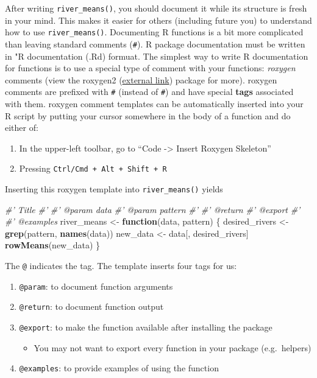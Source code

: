 \documentclass[
]{book}
\newenvironment{Shaded}{\begin{snugshade}}{\end{snugshade}}
\newcommand{\CommentTok}[1]{\textcolor[rgb]{0.56,0.35,0.01}{\textit{#1}}}
\newcommand{\ControlFlowTok}[1]{\textcolor[rgb]{0.13,0.29,0.53}{\textbf{#1}}}
\newcommand{\KeywordTok}[1]{\textcolor[rgb]{0.13,0.29,0.53}{\textbf{#1}}}
\newcommand{\NormalTok}[1]{#1}
\newcommand{\StringTok}[1]{\textcolor[rgb]{0.31,0.60,0.02}{#1}}
\providecommand{\tightlist}{%
  \setlength{\itemsep}{0pt}\setlength{\parskip}{0pt}}
\begin{document}
After writing \texttt{river\_means()}, you should document it while its structure is fresh in your mind. This makes it easier for others (including future you) to understand how to use \texttt{river\_means()}. Documenting R functions is a bit more complicated than leaving standard comments (\texttt{\#}). R package documentation must be written in "R documentation (.Rd) formuat. The simplest way to write R documentation for functions is to use a special type of comment with your functions: \emph{roxygen} comments (view the roxygen2 (\href{https://roxygen2.r-lib.org/}{external link}) package for more). roxygen comments are prefixed with \texttt{\#\textquotesingle{}} (instead of \texttt{\#}) and have special \textbf{tags} associated with them. roxygen comment templates can be automatically inserted into your R script by putting your cursor somewhere in the body of a function and do either of:

\begin{enumerate}
\def\labelenumi{\arabic{enumi}.}
\tightlist
\item
  In the upper-left toolbar, go to ``Code -\textgreater{} Insert Roxygen Skeleton''
\item
  Pressing \texttt{Ctrl/Cmd\ +\ Alt\ +\ Shift\ +\ R}
\end{enumerate}

Inserting this roxygen template into \texttt{river\_means()} yields

\begin{Shaded}
\begin{Highlighting}[]
\CommentTok{#' Title}
\CommentTok{#'}
\CommentTok{#' @param data }
\CommentTok{#' @param pattern }
\CommentTok{#'}
\CommentTok{#' @return}
\CommentTok{#' @export}
\CommentTok{#'}
\CommentTok{#' @examples}
\NormalTok{river_means <-}\StringTok{ }\ControlFlowTok{function}\NormalTok{(data, pattern) \{}
\NormalTok{  desired_rivers <-}\StringTok{ }\KeywordTok{grep}\NormalTok{(pattern, }\KeywordTok{names}\NormalTok{(data))}
\NormalTok{  new_data <-}\StringTok{ }\NormalTok{data[, desired_rivers]}
  \KeywordTok{rowMeans}\NormalTok{(new_data)}
\NormalTok{\}}
\end{Highlighting}
\end{Shaded}

The \texttt{@} indicates the tag. The template inserts four tags for us:

\begin{enumerate}
\def\labelenumi{\arabic{enumi}.}
\tightlist
\item
  \texttt{@param}: to document function arguments
\item
  \texttt{@return}: to document function output
\item
  \texttt{@export}: to make the function available after installing the package

  \begin{itemize}
  \tightlist
  \item
    You may not want to export every function in your package (e.g.~helpers)
  \end{itemize}
\item
  \texttt{@examples}: to provide examples of using the function
\end{enumerate}
\end{document}
